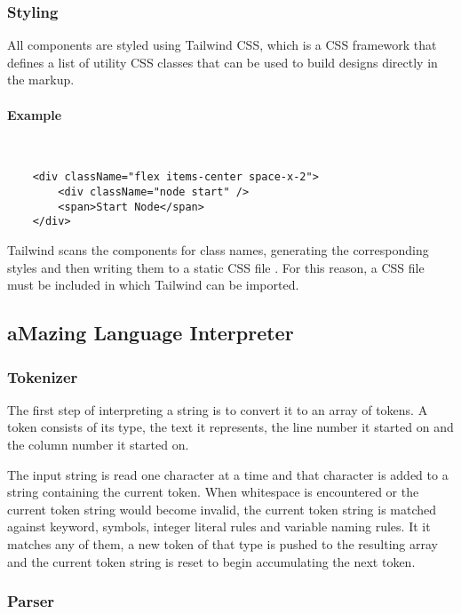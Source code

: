 \subsubsection{Styling}
All components are styled using Tailwind CSS, which is a CSS framework that defines a list of utility CSS classes that can be used to build designs directly in the markup.

\paragraph{Example} \

\begin{verbatim}
    <div className="flex items-center space-x-2">
        <div className="node start" />
        <span>Start Node</span>
    </div>
\end{verbatim}

Tailwind scans the components for class names, generating the corresponding styles and then writing them to a static CSS file \cite{tailwind-utility}. For this reason, a CSS file must be included in which Tailwind can be imported.

\subsection{aMazing Language Interpreter}

\subsubsection{Tokenizer}

The first step of interpreting a string is to convert it to an array of tokens. A token consists of its type, the text it represents, the line number it started on and the column number it started on.

The input string is read one character at a time and that character is added to a string containing the current token. When whitespace is encountered or the current token string would become invalid, the current token string is matched against keyword, symbols, integer literal rules and variable naming rules. It it matches any of them, a new token of that type is pushed to the resulting array and the current token string is reset to begin accumulating the next token.

\subsubsection{Parser}

